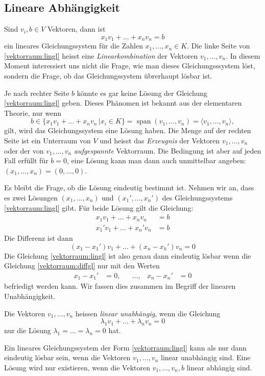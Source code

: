 \subsection{Lineare Abhängigkeit}
Sind $v_i,b\in V$ Vektoren, dann ist
\begin{equation}
x_1 v_1 + \dots + x_n v_n = b
\label{vektorraum:lingl}
\end{equation}
ein lineares Gleichungssystem für die Zahlen $x_1,\dots,x_n\in K$.
Die linke Seite von \eqref{vektorraum:lingl} heisst eine
{\em Linearkombination} der Vektoren $v_1,\dots,v_n$.
In diesem Moment interessiert uns nicht die Frage, wie man dieses
Gleichungsssystem löst, sondern die Frage, ob das Gleichungssystem
übrerhaupt lösbar ist.

Je nach rechter Seite $b$ könnte es gar keine Lösung der Gleichung
\eqref{vektorraum:lingl} geben.
Dieses Phänomen ist bekannt aus der elementaren Theorie, nur wenn
\[
b\in \{ x_1v_1+\dots+ x_nv_n\,|x_i\in K\}
=
\operatorname{span}(v_1,\dots,v_n)
=
\langle v_1,\dots,v_n\rangle,
\]
gilt, wird das Gleichungssystem eine Lösung haben.
Die Menge auf der rechten Seite ist ein Unterraum von $V$ und
heisst das {\em Erzeugnis} der Vektoren $v_1,\dots,v_n$ oder
%
der von $v_1,\dots,v_n$ {\em aufgespannte} Vektorraum.
%
Die Bedingung ist aber auf jeden Fall erfüllt für $b=0$, 
eine Lösung kann man dann auch unmittelbar angeben:
$(x_1,\dots,x_n)=(0,\dots,0)$.

Es bleibt die Frage, ob die Lösung eindeutig bestimmt ist.
Nehmen wir an, dass es zwei Lösungen $(x_1,\dots,x_n)$ und
$(x_1',\dots,x_n')$ des Gleichungssystems \eqref{vektorraum:lingl}
gibt.
Für beide Lösung gilt die Gleichung:
\begin{align*}
x_1v_1+\dots+x_nv_n&=b\\
x_1'v_1+\dots+x_n'v_n&=b
\end{align*}
Die Differenz ist dann
\begin{equation}
(x_1-x_1')v_1+\dots + (x_n-x_h') v_n = 0
\label{vektorraum:diffgl}
\end{equation}
Die Gleichung
\eqref{vektorraum:lingl} ist also genau dann eindeutig lösbar
wenn die Gleichung \eqref{vektorraum:diffgl} nur mit den Werten
\[
\begin{aligned}
x_1-x_1'&=0,&&\dots,&
x_n-x_n'&=0
\end{aligned}
\]
befriedigt werden kann.
Wir fassen dies zusammen im Begriff der linearen Unabhängigkeit.

\begin{definition}
Die Vektoren $v_1,\dots,v_n$ heissen {\em linear unabhängig}, wenn die
Gleichung
\[
\lambda_1v_1 + \dots + \lambda_nv_n=0
\]
nur die Lösung $\lambda_1=\dots=\lambda_n=0$ hat.
\end{definition}

Ein lineares Gleichungssystem der Form \eqref{vektorraum:lingl}
kann als nur dann eindeutig lösbar sein, wenn die Vektoren
$v_1,\dots,v_n$ linear unabhängig sind.
Eine Lösung wird nur existieren, wenn die Vektoren
$v_1,\dots,v_n,b$ linear abhängig sind.


